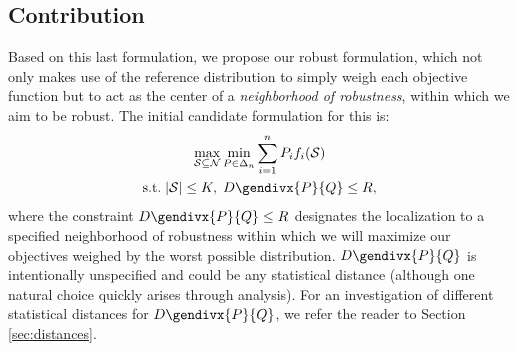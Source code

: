 \documentclass[letter,11pt]{article}
\newcommand{\gendiv}{D\gendivx}
\def\sS{\mathcal{S}}
\def\sN{\mathcal{N}}
\begin{document}
\subsection{Contribution}

Based on this last formulation, we propose our robust formulation, which not only makes use of the reference distribution to simply weigh each objective function but to act as the center of a \textit{neighborhood of robustness}, within which we aim to be robust. The initial candidate formulation for this is:
\begin{equation}\label{novel-robust}
\begin{gathered}
\max_{\sS \subseteq \sN} \min_{P \in \Delta_n} \sum^n_{i=1} P_i f_i(\sS) \\
\text{s.t.}\; \lvert \sS\rvert \leq K, \; \gendiv{P}{Q} \leq R,
\end{gathered}
\end{equation}
where the constraint $\gendiv{P}{Q} \leq R$ designates the localization to a specified neighborhood of robustness within which we will maximize our objectives weighed by the worst possible distribution. $\gendiv{P}{Q}$ is intentionally unspecified and could be any statistical distance (although one natural choice quickly arises through analysis). For an investigation of different statistical distances for $\gendiv{P}{Q}$, we refer the reader to Section \ref{sec:distances}.
\end{document}
